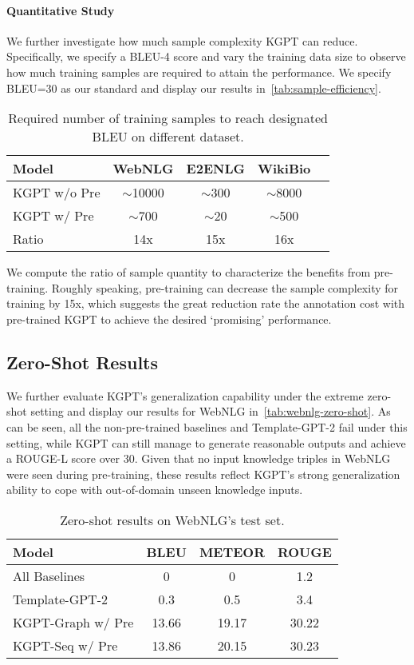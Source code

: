 \documentclass[11pt,a4paper]{article}
\newcommand{\model}{KGPT\xspace}
\begin{document}
\paragraph{Quantitative Study}
We further investigate how much sample complexity \model can reduce. Specifically, we specify a BLEU-4 score and vary the training data size to observe how much training samples are required to attain the performance. We specify BLEU=30 as our standard and display our results in~\autoref{tab:sample-efficiency}.
\begin{table}[!thb]
\centering
\small
\begin{tabular}{lcccc}
\hline
Model & WebNLG & E2ENLG & WikiBio\\
\hline
\model w/o Pre  & $\sim$10000  &  $\sim$300    & $\sim$8000   &  \\
\model w/ Pre  & $\sim$700   &   $\sim$20    &  $\sim$500  &  \\
Ratio &   14x & 15x  & 16x \\
\hline
\end{tabular}
\caption{Required number of training samples to reach designated BLEU on different dataset.}
\label{tab:sample-efficiency}
\vspace{-1ex}
\end{table}
We compute the ratio of sample quantity to characterize the benefits from pre-training. Roughly speaking, pre-training can decrease the sample complexity for training by 15x, which suggests the great reduction rate the annotation cost with pre-trained \model to achieve the desired `promising' performance. 

\subsection{Zero-Shot Results}
We further evaluate \model's generalization capability under the extreme zero-shot setting and display our results for WebNLG in~\autoref{tab:webnlg-zero-shot}. As can be seen, all the non-pre-trained baselines and Template-GPT-2 fail under this setting, while \model can still manage to generate reasonable outputs and achieve a ROUGE-L score over 30. Given that no input knowledge triples in WebNLG were seen during pre-training, these results reflect \model's strong generalization ability to cope with out-of-domain unseen knowledge inputs.
\begin{table}[!thb]
\centering
\small
\begin{tabular}{lccc}
\hline
Model & BLEU & METEOR & ROUGE\\
\hline
All Baselines & 0 & 0 & 1.2 \\
Template-GPT-2 & 0.3  & 0.5 & 3.4 \\
\hline
\model-Graph w/ Pre   & 13.66 & 19.17 & 30.22 \\
\model-Seq w/ Pre & 13.86 & 20.15 & 30.23 \\
\hline
\end{tabular}
\caption{Zero-shot results on WebNLG's test set. }
\label{tab:webnlg-zero-shot}
\end{table}
\end{document}
